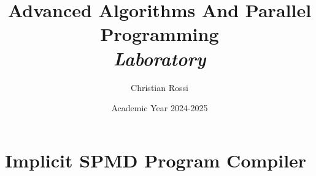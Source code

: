 \documentclass[12pt, a4paper]{report}
\title{\textbf{Advanced Algorithms And Parallel Programming} \\ \textit{Laboratory}}
\author{Christian Rossi}
\date{Academic Year 2024-2025}
\begin{document}
    \maketitle

    

    \cleardoublepage

    \tableofcontents

    \cleardoublepage

    \chapter{Implicit SPMD Program Compiler}
    
\end{document}
